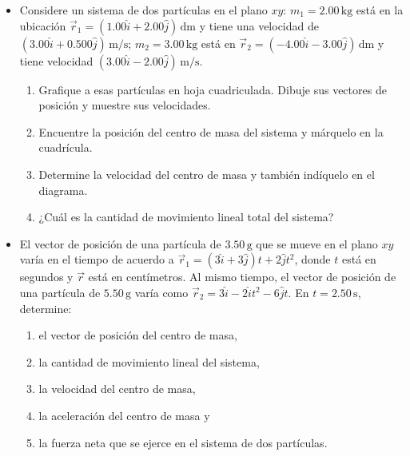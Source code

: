 \documentclass[11pt,a4paper]{article}
\begin{document}
\begin{itemize}
    \item[\textbf{27.}] Considere un sistema de dos partículas en el plano \(xy\): \(m_1 = 2.00\,\text{kg}\) está en la ubicación \(\vec{r}_1 = (1.00\hat{i} + 2.00\hat{j})\,\text{dm}\) y tiene una velocidad de \((3.00\hat{i} + 0.500\hat{j})\,\text{m/s}\); \(m_2 = 3.00\,\text{kg}\) está en \(\vec{r}_2 = (-4.00\hat{i} - 3.00\hat{j})\,\text{dm}\) y tiene velocidad \((3.00\hat{i} - 2.00\hat{j})\,\text{m/s}\).
    \begin{enumerate}
        \item Grafique a esas partículas en hoja cuadriculada. Dibuje sus vectores de posición y muestre sus velocidades.
        \item Encuentre la posición del centro de masa del sistema y márquelo en la cuadrícula.
        \item Determine la velocidad del centro de masa y también indíquelo en el diagrama.
        \item ¿Cuál es la cantidad de movimiento lineal total del sistema?
    \end{enumerate}
    \vspace*{6cm}

    \item[\textbf{28.}] El vector de posición de una partícula de \(3.50\,\text{g}\) que se mueve en el plano \(xy\) varía en el tiempo de acuerdo a \(\vec{r}_1 = (3\hat{i} + 3\hat{j})t + 2\hat{j}t^2\), donde \(t\) está en segundos y \(\vec{r}\) está en centímetros. Al mismo tiempo, el vector de posición de una partícula de \(5.50\,\text{g}\) varía como \(\vec{r}_2 = 3\hat{i} - 2\hat{i}t^2 - 6\hat{j}t\). En \(t = 2.50\,\text{s}\), determine:
    \begin{enumerate}
        \item el vector de posición del centro de masa,
        \item la cantidad de movimiento lineal del sistema,
        \item la velocidad del centro de masa,
        \item la aceleración del centro de masa y
        \item la fuerza neta que se ejerce en el sistema de dos partículas.
    \end{enumerate}
    \vspace*{7cm}
\end{itemize}

\newpage
\end{document}
